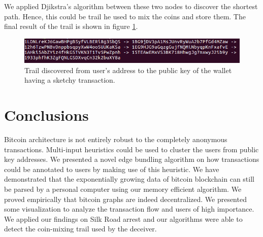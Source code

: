\documentclass[runningheads,a4paper]{llncs}[2017/09/04]
\begin{document}
We applied Djikstra’s algorithm between these two nodes to discover the shortest path. Hence, this could be trail he used to mix the coins and store them.
The final result of the trail is shown in figure \ref{trail}.

\begin{figure}[h]
	\centering 
	\includegraphics[width=\columnwidth]{trail} 
	\caption{Trail discovered from user's address to the public key of the wallet having a sketchy transaction.} %
	\label{trail}
\end{figure}

\section{Conclusions}
Bitcoin architecture is not entirely robust to the completely anonymous transactions.
Multi-input heuristics could be used to cluster the users from public key addresses. 
We presented a novel edge bundling algorithm on how transactions could be annotated to users by making use of this heuristic.
We have demonstrated that the exponentially growing data of bitcoin blockchain can still be parsed by a personal computer using our memory efficient algorithm.
We proved empirically that bitcoin graphs are indeed decentralized.
We presented some visualization to analyze the transaction flow and users of high importance.
We applied our findings on Silk Road arrest and our algorithms were able to detect the coin-mixing trail used by the deceiver.





\end{document}
